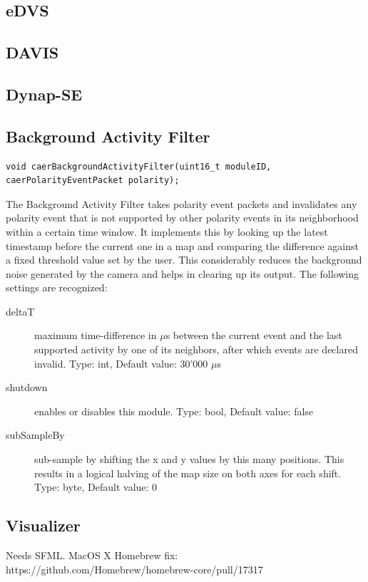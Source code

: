 \documentclass[a4paper,12pt]{report}
\begin{document}
\subsection{eDVS}
\subsection{DAVIS}
\subsection{Dynap-SE}
\subsection{Background Activity Filter} \label{subsec:backgroundactivityfilter}

\begin{lstlisting}
void caerBackgroundActivityFilter(uint16_t moduleID, caerPolarityEventPacket polarity);
\end{lstlisting}

The Background Activity Filter takes polarity event packets and invalidates any polarity event that is not supported by other polarity events in its neighborhood within a certain time window.
It implements this by looking up the latest timestamp before the current one in a map and comparing the difference against a fixed threshold value set by the user.
This considerably reduces the background noise generated by the camera and helps in clearing up its output.
\clearpage
The following settings are recognized:
\begin{description}
\item[deltaT] maximum time-difference in $\mu$s between the current event and the last supported activity by one of its neighbors, after which events are declared invalid.
\subitem Type: int, Default value: 30'000 $\mu$s
\item[shutdown] enables or disables this module.
\subitem Type: bool, Default value: false
\item[subSampleBy] sub-sample by shifting the x and y values by this many positions. This results in a logical halving of the map size on both axes for each shift.
\subitem Type: byte, Default value: 0
\end{description}
\subsection{Visualizer}

Needs SFML.
MacOS X Homebrew fix: https://github.com/Homebrew/homebrew-core/pull/17317
\end{document}
